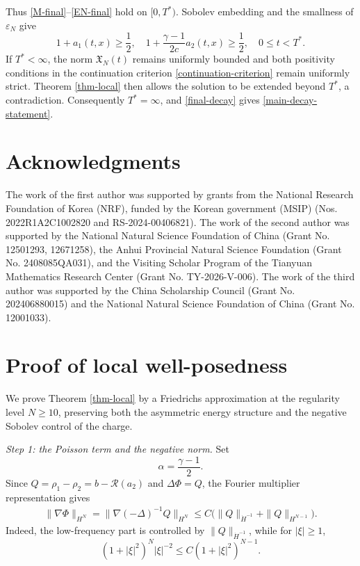 \documentclass[10pt,reqno]{amsart}
\numberwithin{equation}{section}
\begin{document}
Thus \eqref{M-final}--\eqref{EN-final} hold on $[0,T^*)$.  Sobolev embedding and the smallness of $\varepsilon_N$ give
\[
1+a_1(t,x)\ge\frac12, \quad 1+\frac{\gamma-1}{2c}a_2(t,x)\ge\frac12, \quad 0\le t<T^*.
\]
If $T^*<\infty$, the norm $\mathfrak X_N(t)$ remains uniformly bounded and both positivity conditions in the continuation criterion \eqref{continuation-criterion} remain uniformly strict.  Theorem \ref{thm-local} then allows the solution to be extended beyond $T^*$, a contradiction. Consequently $T^*=\infty$, and \eqref{final-decay} gives \eqref{main-decay-statement}.
 
 



%
%
%
%
%
%
\section*{Acknowledgments}
The work of the first author was supported by grants from the National Research Foundation of Korea (NRF), funded by the Korean government (MSIP) (Nos. 2022R1A2C1002820 and RS-2024-00406821). The work of the second author was supported by the National Natural Science Foundation of China (Grant No. 12501293, 12671258), the Anhui Provincial Natural Science Foundation (Grant No. 2408085QA031), and the Visiting Scholar Program of the Tianyuan Mathematics Research Center (Grant No. TY-2026-V-006). The work of the third author was supported by the China Scholarship Council (Grant No. 202406880015) and the National Natural Science Foundation of China (Grant No. 12001033).






%
%
%
%
%
%
\appendix
\section{Proof of local well-posedness} \label{appendix-local}

We prove Theorem \ref{thm-local} by a Friedrichs approximation at the regularity level $N\ge10$, preserving both the asymmetric energy structure and the negative Sobolev control of the charge.

\medskip
\noindent\emph{Step 1: the Poisson term and the negative norm.} Set
\[
\alpha=\frac{\gamma-1}{2}.
\]
Since $Q=\rho_1-\rho_2=b-\mathcal R(a_2)$ and $\Delta\Phi=Q$, the
Fourier multiplier representation gives
\begin{align}\label{local-poisson-est}
\|\nabla\Phi\|_{H^N}
=\|\nabla(-\Delta)^{-1}Q\|_{H^N}
\le C\bigl(\|Q\|_{\dot H^{-1}}+\|Q\|_{H^{N-1}}\bigr).
\end{align}
Indeed, the low-frequency part is controlled by
$\|Q\|_{\dot H^{-1}}$, while for $|\xi|\ge1$,
\[
(1+|\xi|^2)^N|\xi|^{-2}
\le C(1+|\xi|^2)^{N-1}.
\]
\end{document}
